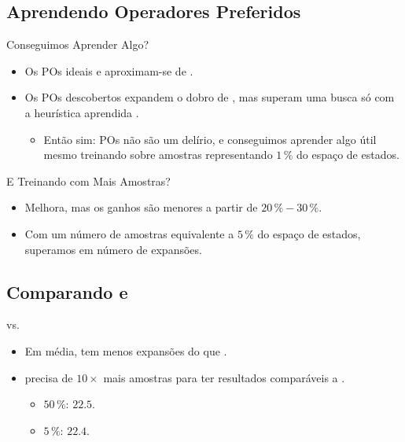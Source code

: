 \documentclass{beamer}
\begin{document}
\subsection{Aprendendo Operadores Preferidos}
\begin{frame}{Conseguimos Aprender Algo?}

\pause
\begin{itemize}
\item Os POs ideais \postartable e \postar aproximam-se de \hstar.
\pause
\item Os POs descobertos \pog expandem o dobro de \hstar, mas superam uma busca só com a heurística aprendida \hnn.
\pause
  \begin{itemize}
    \item Então sim: POs não são um delírio, e \alert{conseguimos aprender algo útil} mesmo treinando sobre amostras representando \alert{$1\,\%$ do espaço de estados}.
  \end{itemize}
\end{itemize}
\end{frame}

\begin{frame}{E Treinando com Mais Amostras?}

\begin{itemize}
  \item Melhora, mas os ganhos são menores a partir de $20\,\% - 30\,\%$.
  \pause
  \item Com um número de amostras equivalente a \alert{$5\,\%$} do espaço de estados, \alert{superamos \poff} em número de expansões.
\end{itemize}
\end{frame}

\subsection{Comparando \bfsrs e \bfsrw}
\begin{frame}{\bfsrs vs. \bfsrw}

\begin{itemize}
  \item Em média, \pog \alert{tem menos expansões do que} \pofsm.
  \pause
  \item \pofsm \alert{precisa de $10\times$ mais amostras} para ter resultados comparáveis a \pog.
    \begin{itemize}
      \item \pofsm $50\,\%$: $22.5$.
      \item \pog $5\,\%$: $22.4$.
    \end{itemize}
\end{itemize}
\end{frame}
\end{document}
